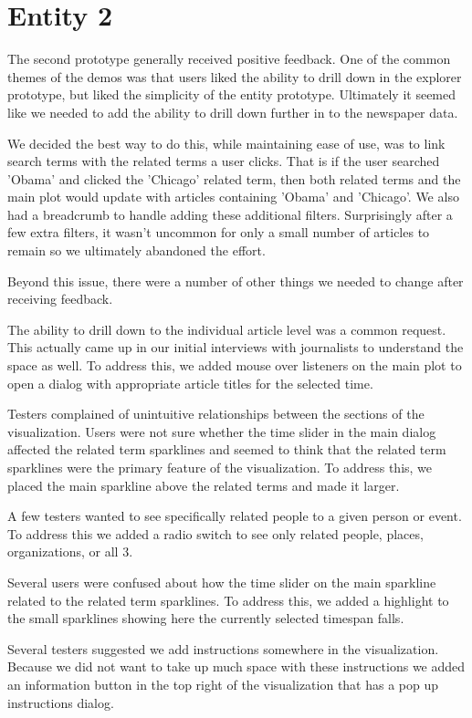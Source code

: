 \section{Entity 2}
The second prototype generally received positive feedback. One of the common themes of the demos was that users liked the ability to drill down in the explorer prototype, but liked the simplicity of the entity prototype. Ultimately it seemed like we needed to add the ability to drill down further in to the newspaper data.

We decided the best way to do this, while maintaining ease of use, was to link search terms with the related terms a user clicks. That is if the user searched 'Obama' and clicked the 'Chicago' related term, then both related terms and the main plot would update with articles containing 'Obama' and 'Chicago'. We also had a breadcrumb to handle adding these additional filters. Surprisingly after a few extra filters, it wasn't uncommon for only a small number of articles to remain so we ultimately abandoned the effort.

Beyond this issue, there were a number of other things we needed to change after receiving feedback.

The ability to drill down to the individual article level was a common request. This actually came up in our initial interviews with journalists to understand the space as well. To address this, we added mouse over listeners on the main plot to open a dialog with appropriate article titles for the selected time.

Testers complained of unintuitive relationships between the sections of the visualization. Users were not sure whether the time slider in the main dialog affected the related term sparklines and seemed to think that the related term sparklines were the primary feature of the visualization. To address this, we placed the main sparkline above the related terms and made it larger.

A few testers wanted to see specifically related people to a given person or event. To address this we added a radio switch to see only related people, places, organizations, or all 3.

Several users were confused about how the time slider on the main sparkline related to the related term sparklines. To address this, we added a highlight to the small sparklines showing here the currently selected timespan falls. 

Several testers suggested we add instructions somewhere in the visualization. Because we did not want to take up much space with these instructions we added an information button in the top right of the visualization that has a pop up instructions dialog.

